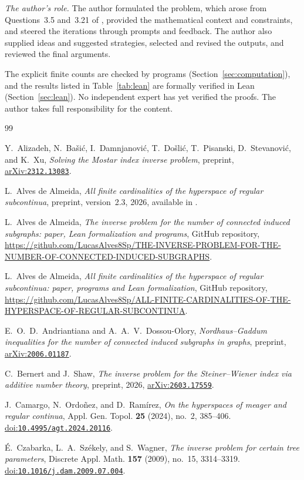 \documentclass[11pt]{amsart}
\theoremstyle{definition}
\theoremstyle{remark}
\newcommand{\doi}[1]{\href{https://doi.org/#1}{doi:\nolinkurl{#1}}}
\newcommand{\arXiv}[1]{\href{https://arxiv.org/abs/#1}{arXiv:\nolinkurl{#1}}}
\newcommand{\grepo}{\url{https://github.com/LucasAlves8Sp/THE-INVERSE-PROBLEM-FOR-THE-NUMBER-OF-CONNECTED-INDUCED-SUBGRAPHS}}
\newcommand{\repo}{\url{https://github.com/LucasAlves8Sp/ALL-FINITE-CARDINALITIES-OF-THE-HYPERSPACE-OF-REGULAR-SUBCONTINUA}}
\begin{document}
\emph{The author's role.} The author formulated the problem, which arose from Questions~3.5 and~3.21 of \cite{CORa}, provided the mathematical context and constraints, and steered the iterations through prompts and feedback. The author also supplied ideas and suggested strategies, selected and revised the outputs, and reviewed the final arguments.

The explicit finite counts are checked by programs (Section~\ref{sec:computation}), and the results listed in Table~\ref{tab:lean} are formally verified in Lean (Section~\ref{sec:lean}). No independent expert has yet verified the proofs. The author takes full responsibility for the content.

\begin{thebibliography}{99}

Y.~Alizadeh, N.~Ba\v{s}i\'c, I.~Damnjanovi\'c, T.~Do\v{s}li\'c, T.~Pisanski, D.~Stevanovi\'c, and K.~Xu,
\emph{Solving the Mostar index inverse problem},
preprint, \arXiv{2312.13083}.

L.~Alves de Almeida,
\emph{All finite cardinalities of the hyperspace of regular subcontinua},
preprint, version~2.3, 2026, available in \cite{Rep}.

L.~Alves de Almeida,
\emph{The inverse problem for the number of connected induced subgraphs: paper, Lean formalization and programs},
GitHub repository, \grepo.

L.~Alves de Almeida,
\emph{All finite cardinalities of the hyperspace of regular subcontinua: paper, programs and Lean formalization},
GitHub repository, \repo.

E.~O.~D.~Andriantiana and A.~A.~V.~Dossou-Olory,
\emph{Nordhaus--Gaddum inequalities for the number of connected induced subgraphs in graphs},
preprint, \arXiv{2006.01187}.

C.~Bernert and J.~Shaw,
\emph{The inverse problem for the Steiner--Wiener index via additive number theory},
preprint, 2026, \arXiv{2603.17559}.

J.~Camargo, N.~Ordo\~nez, and D.~Ram\'irez,
\emph{On the hyperspaces of meager and regular continua},
Appl. Gen. Topol. \textbf{25} (2024), no.~2, 385--406.
\doi{10.4995/agt.2024.20116}.

\'E.~Czabarka, L.~A.~Sz\'ekely, and S.~Wagner,
\emph{The inverse problem for certain tree parameters},
Discrete Appl. Math. \textbf{157} (2009), no.~15, 3314--3319.
\doi{10.1016/j.dam.2009.07.004}.


\end{thebibliography}
\end{document}
